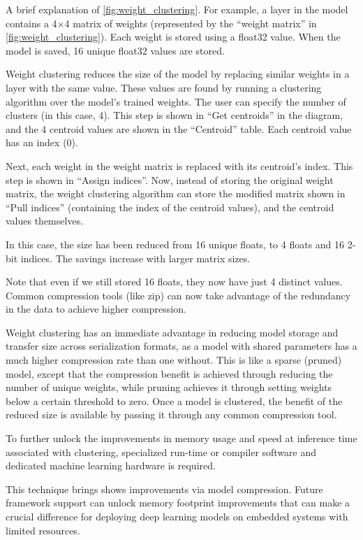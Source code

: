 A brief explanation of \autoref{fig:weight_clustering}. For example, a layer in
the model contains a 4$\times$4 matrix of weights (represented by the
``weight matrix'' in \autoref{fig:weight_clustering}). Each weight is stored
using a float32 value. When the model is saved, 16 unique float32 values are
stored.

Weight clustering reduces the size of the model by replacing similar weights in
a layer with the same value. These values are found by running a clustering
algorithm over the model’s trained weights. The user can specify the number of
clusters (in this case, 4). This step is shown in ``Get centroids'' in the
diagram, and the 4 centroid values are shown in the ``Centroid'' table. Each
centroid value has an index (0).

Next, each weight in the weight matrix is replaced with its centroid’s index.
This step is shown in ``Assign indices''. Now, instead of storing the original
weight matrix, the weight clustering algorithm can store the modified matrix
shown in ``Pull indices'' (containing the index of the centroid values), and
the centroid values themselves.

In this case, the size has been reduced from 16 unique floats, to 4 floats and
16 2-bit indices. The savings increase with larger matrix sizes.

Note that even if we still stored 16 floats, they now have just 4 distinct
values. Common compression tools (like zip) can now take advantage of the
redundancy in the data to achieve higher compression.

Weight clustering has an immediate advantage in reducing model storage and
transfer size across serialization formats, as a model with shared parameters
has a much higher compression rate than one without. This is like a sparse
(pruned) model, except that the compression benefit is achieved through
reducing the number of unique weights, while pruning achieves it through
setting weights below a certain threshold to zero. Once a model is clustered,
the benefit of the reduced size is available by passing it through any common
compression tool.

To further unlock the improvements in memory usage and speed at inference time
associated with clustering, specialized run-time or compiler software and
dedicated machine learning hardware is required.~\cite{tfmot:clustering_blog}

This technique brings shows improvements via model compression. Future
framework support can unlock memory footprint improvements that can make a
crucial difference for deploying deep learning models on embedded systems with
limited resources.


